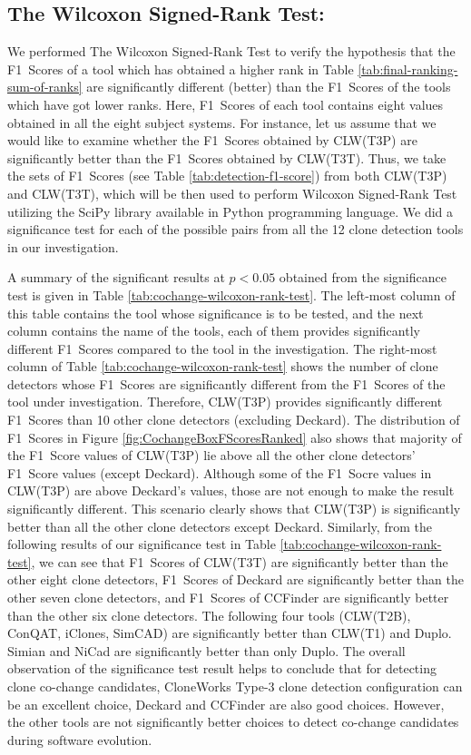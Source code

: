 \documentclass[review]{elsarticle}
\begin{document}
\subsection{The Wilcoxon Signed-Rank Test:}
\label{sec-wilcoxon-singed-rank-test}
We performed The Wilcoxon Signed-Rank Test \cite{wilcoxon-signed-rank-test, wilcoxon-signed-rank-test-rosner} to verify the hypothesis that the F1~Scores of a tool which has obtained a higher rank in Table \ref{tab:final-ranking-sum-of-ranks} are significantly different (better) than the F1~Scores of the tools which have got lower ranks. Here, F1~Scores of each tool contains eight values obtained in all the eight subject systems. For instance, let us assume that we would like to examine whether the F1~Scores obtained by CLW(T3P) are significantly better than the F1~Scores obtained by CLW(T3T). Thus, we take the sets of F1~Scores (see Table \ref{tab:detection-f1-score}) from both CLW(T3P) and CLW(T3T), which will be then used to perform Wilcoxon Signed-Rank Test utilizing the SciPy library \cite{SciPy-NMeth2020} available in Python programming language. We did a significance test for each of the possible pairs from all the 12 clone detection tools in our investigation. 

A summary of the significant results at $p<0.05$ obtained from the significance test is given in Table \ref{tab:cochange-wilcoxon-rank-test}. The left-most column of this table contains the tool whose significance is to be tested, and the next column contains the name of the tools, each of them provides significantly different F1~Scores compared to the tool in the investigation. The right-most column of Table \ref{tab:cochange-wilcoxon-rank-test} shows the number of clone detectors whose F1~Scores are significantly different from the F1~Scores of the tool under investigation. Therefore, CLW(T3P) provides significantly different F1~Scores than 10 other clone detectors (excluding Deckard). The distribution of F1~Scores in Figure \ref{fig:CochangeBoxFScoresRanked} also shows that majority of the F1~Score values of CLW(T3P) lie above all the other clone detectors'  F1~Score values (except Deckard). Although some of the F1~Socre values in CLW(T3P) are above Deckard's values, those are not enough to make the result significantly different. This scenario clearly shows that CLW(T3P) is significantly better than all the other clone detectors except Deckard. Similarly, from the following results of our significance test in Table \ref{tab:cochange-wilcoxon-rank-test}, we can see that F1~Scores of CLW(T3T) are significantly better than the other eight clone detectors, F1~Scores of Deckard are significantly better than the other seven clone detectors, and F1~Scores of CCFinder are significantly better than the other six clone detectors. The following four tools (CLW(T2B), ConQAT, iClones, SimCAD) are significantly better than CLW(T1) and Duplo. Simian and NiCad are significantly better than only Duplo. The overall observation of the significance test result helps to conclude that for detecting clone co-change candidates, CloneWorks Type-3 clone detection configuration can be an excellent choice, Deckard and CCFinder are also good choices. However, the other tools are not significantly better choices to detect co-change candidates during software evolution. 
\end{document}
